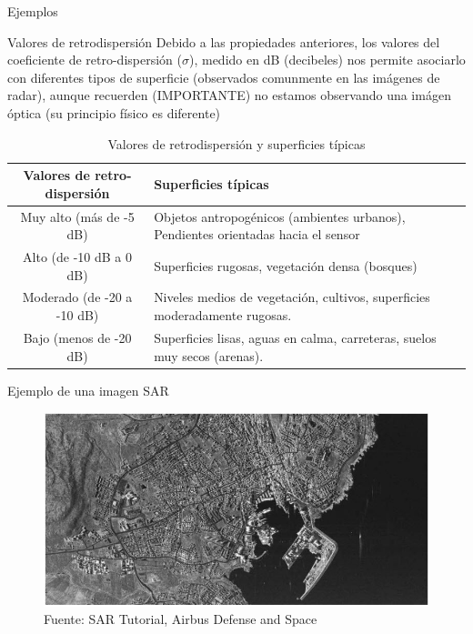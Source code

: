 \begin{frame}{Ejemplos}
  \footnotesize
  \begin{block}{Valores de retrodispersión}
    Debido a las propiedades anteriores, los valores del coeficiente de retro-dispersión ($\sigma$), medido en dB (decibeles) nos permite asociarlo con diferentes tipos de superficie (observados comunmente en las imágenes de radar), aunque recuerden (IMPORTANTE) no estamos observando una imágen óptica (su principio físico es diferente)
  \end{block}

  \tiny
  \begin{table}
    \caption{Valores de retrodispersión y superficies típicas}
    \label{tab:retrodispersion_superficies}
    \begin{center}
      \begin{tabular}[c]{c|l}
        \hline
        Valores de retro-dispersión & Superficies típicas \\
        \hline
        Muy alto (más de -5 dB) & 
        Objetos antropogénicos (ambientes urbanos), Pendientes orientadas hacia el sensor \\
        Alto (de -10 dB a 0 dB) & Superficies rugosas, vegetación densa (bosques) \\
        Moderado (de -20 a -10 dB) & Niveles medios de vegetación, cultivos, superficies moderadamente rugosas. \\
        Bajo (menos de -20 dB) & Superficies lisas, aguas en calma, carreteras, suelos muy secos (arenas). \\
        \hline
      \end{tabular}
    \end{center}
  \end{table}
\end{frame}

\begin{frame}{Ejemplo de una imagen SAR}
    \begin{figure}
        \centering
        \includegraphics[scale=0.4]{img/section_03/principios_basicos}
        \caption{Fuente: SAR Tutorial, Airbus Defense and Space}
        \label{fig:section_03_dinamica_sar_petroleo}
    \end{figure}
\end{frame}

